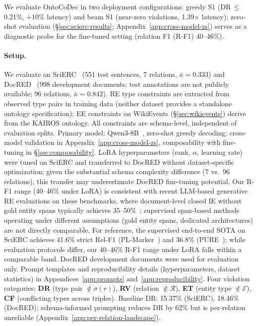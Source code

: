 
\label{sec:violation_landscape}

We evaluate OntoCoDec in two deployment configurations: greedy S1 (DR\,$\leq$\,0.21\%, $+$10\% latency) and beam S1 (near-zero violations, 1.39$\times$ latency); zero-shot evaluation (\S\ref{sec:scierc-results}; Appendix~\ref{app:cross-model-zs}) serves as a diagnostic probe for the fine-tuned setting (relation F1 (R-F1) 40--46\%).

\paragraph{Setup.}
We evaluate on SciERC~\cite{luan2018scierc} (551 test sentences, 7 relations, $\bar{\kappa}{=}0.333$) and DocRED~\cite{yao2019docred} (998 development documents; test annotations are not publicly available; 96 relations, $\bar{\kappa}{=}0.842$).
RE type constraints are extracted from observed type pairs in training data (neither dataset provides a standalone ontology specification); EE constraints on WikiEvents (\S\ref{sec:wikievents}) derive from the KAIROS ontology.
All constraints are schema-level, independent of evaluation splits.
Primary model: Qwen3-8B~\cite{qwen2025qwen3}, zero-shot greedy decoding; cross-model validation in Appendix~\ref{app:cross-model-zs}, composability with fine-tuning in \S\ref{sec:composability}.
LoRA hyperparameters (rank, $\alpha$, learning rate) were tuned on SciERC and transferred to DocRED without dataset-specific optimization; given the substantial schema complexity difference (7 vs.\ 96 relations), this transfer may underestimate DocRED fine-tuning potential.
Our R-F1 range (40--46\% under LoRA) is consistent with recent LLM-based generative RE evaluations on these benchmarks, where document-level closed IE without gold entity spans typically achieves 35--50\%~\cite{wadhwa2023revisiting}; supervised span-based methods operating under different assumptions (gold entity spans, dedicated architectures) are not directly comparable.
For reference, the supervised end-to-end SOTA on SciERC achieves 41.6\% strict Rel-F1 (PL-Marker~\cite{ye2022packed}) and 36.8\% (PURE~\cite{zhong2021frustratingly}); while evaluation protocols differ, our 40--46\% R-F1 range under LoRA falls within a comparable band.
DocRED development documents were used for evaluation only.
Prompt templates and reproducibility details (hyperparameters, dataset statistics) in Appendices~\ref{app:prompts} and~\ref{app:reproducibility}.
Four violation categories: \textbf{DR} (type pair $\notin \sigma(r)$), \textbf{RV} (relation $\notin \mathcal{R}$), \textbf{ET} (entity type $\notin \mathcal{E}$), \textbf{CF} (conflicting types across triples).
Baseline DR: 15.37\% (SciERC), 18.46\% (DocRED); schema-informed prompting reduces DR by 62\% but is per-relation unreliable (Appendix~\ref{app:per-relation-landscape}).

